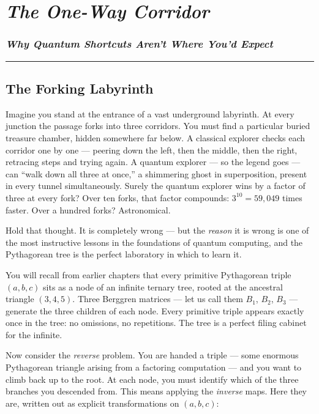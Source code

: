 \chapter{\texorpdfstring{\emph{The One-Way Corridor}}{The One-Way Corridor}}
\subsection{\texorpdfstring{\emph{Why Quantum Shortcuts Aren't Where You'd Expect}}{Why Quantum Shortcuts Aren't Where You'd Expect}}
\bigskip\noindent\rule{\linewidth}{0.4pt}\bigskip

\section{The Forking Labyrinth}
Imagine you stand at the entrance of a vast underground labyrinth. At every junction the passage forks into three corridors. You must find a particular buried treasure chamber, hidden somewhere far below. A classical explorer checks each corridor one by one --- peering down the left, then the middle, then the right, retracing steps and trying again. A quantum explorer --- so the legend goes --- can ``walk down all three at once,'' a shimmering ghost in superposition, present in every tunnel simultaneously. Surely the quantum explorer wins by a factor of three at every fork? Over ten forks, that factor compounds: \(3^{10} = 59{,}049\) times faster. Over a hundred forks? Astronomical.

Hold that thought. It is completely wrong --- but the \emph{reason} it is wrong is one of the most instructive lessons in the foundations of quantum computing, and the Pythagorean tree is the perfect laboratory in which to learn it.

You will recall from earlier chapters that every primitive Pythagorean triple \((a, b, c)\) sits as a node of an infinite ternary tree, rooted at the ancestral triangle \((3, 4, 5)\). Three Berggren matrices --- let us call them \(B_1\), \(B_2\), \(B_3\) --- generate the three children of each node. Every primitive triple appears exactly once in the tree: no omissions, no repetitions. The tree is a perfect filing cabinet for the infinite.

Now consider the \emph{reverse} problem. You are handed a triple --- some enormous Pythagorean triangle arising from a factoring computation --- and you want to climb back up to the root. At each node, you must identify which of the three branches you descended from. This means applying the \emph{inverse} maps. Here they are, written out as explicit transformations on \((a, b, c)\):

